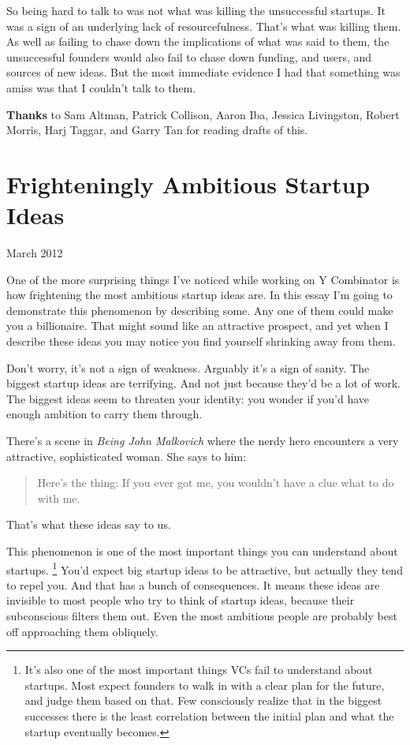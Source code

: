 \documentclass[12pt]{book}
\begin{document}
So being hard to talk to was not what was killing the unsuccessful
startups. It was a sign of an underlying lack of resourcefulness. That's
what was killing them. As well as failing to chase down the implications
of what was said to them, the unsuccessful founders would also fail to
chase down funding, and users, and sources of new ideas. But the most
immediate evidence I had that something was amiss was that I couldn't
talk to them.


\textbf{Thanks} to Sam Altman, Patrick Collison, Aaron Iba, Jessica
Livingston, Robert Morris, Harj Taggar, and Garry Tan for reading drafts
of this.
\chapter{Frighteningly Ambitious Startup Ideas}

March 2012

One of the more surprising things I've noticed while working on Y
Combinator is how frightening the most ambitious startup ideas are. In
this essay I'm going to demonstrate this phenomenon by describing some.
Any one of them could make you a billionaire. That might sound like an
attractive prospect, and yet when I describe these ideas you may notice
you find yourself shrinking away from them.

Don't worry, it's not a sign of weakness. Arguably it's a sign of
sanity. The biggest startup ideas are terrifying. And not just because
they'd be a lot of work. The biggest ideas seem to threaten your
identity: you wonder if you'd have enough ambition to carry them
through.

There's a scene in \emph{Being John Malkovich} where the nerdy hero
encounters a very attractive, sophisticated woman. She says to him:

\begin{quote}
Here's the thing: If you ever got me, you wouldn't have a clue what to
do with me.
\end{quote}

That's what these ideas say to us.

This phenomenon is one of the most important things you can understand
about startups. \footnote{It's also one of the most important things VCs fail to
understand about startups. Most expect founders to walk in with a clear
plan for the future, and judge them based on that. Few consciously
realize that in the biggest successes there is the least correlation
between the initial plan and what the startup eventually becomes.} You'd expect big startup ideas
to be attractive, but actually they tend to repel you. And that has a
bunch of consequences. It means these ideas are invisible to most people
who try to think of startup ideas, because their subconscious filters
them out. Even the most ambitious people are probably best off
approaching them obliquely.
\end{document}
